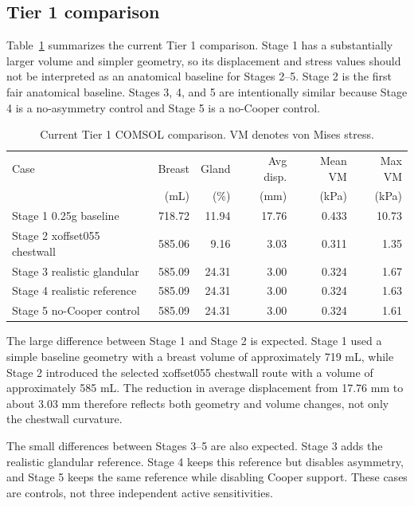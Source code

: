 \subsection{Tier 1 comparison}

Table~\ref{tab:tier1_results} summarizes the current Tier 1 comparison. Stage 1 has a substantially larger volume and simpler geometry, so its displacement and stress values should not be interpreted as an anatomical baseline for Stages 2--5. Stage 2 is the first fair anatomical baseline. Stages 3, 4, and 5 are intentionally similar because Stage 4 is a no-asymmetry control and Stage 5 is a no-Cooper control.

\begin{table}[H]
\centering
\small
\caption{Current Tier 1 COMSOL comparison. VM denotes von Mises stress.}
\label{tab:tier1_results}
\begin{tabular}{lrrrrr}
\toprule
Case & Breast & Gland & Avg disp. & Mean VM & Max VM \\
 & (mL) & (\%) & (mm) & (kPa) & (kPa) \\
\midrule
Stage 1 0.25g baseline & 718.72 & 11.94 & 17.76 & 0.433 & 10.73 \\
Stage 2 xoffset055 chestwall & 585.06 & 9.16 & 3.03 & 0.311 & 1.35 \\
Stage 3 realistic glandular & 585.09 & 24.31 & 3.00 & 0.324 & 1.67 \\
Stage 4 realistic reference & 585.09 & 24.31 & 3.00 & 0.324 & 1.63 \\
Stage 5 no-Cooper control & 585.09 & 24.31 & 3.00 & 0.324 & 1.61 \\
\bottomrule
\end{tabular}
\end{table}

The large difference between Stage 1 and Stage 2 is expected. Stage 1 used a simple baseline geometry with a breast volume of approximately 719 mL, while Stage 2 introduced the selected xoffset055 chestwall route with a volume of approximately 585 mL. The reduction in average displacement from 17.76 mm to about 3.03 mm therefore reflects both geometry and volume changes, not only the chestwall curvature.

The small differences between Stages 3--5 are also expected. Stage 3 adds the realistic glandular reference. Stage 4 keeps this reference but disables asymmetry, and Stage 5 keeps the same reference while disabling Cooper support. These cases are controls, not three independent active sensitivities.

